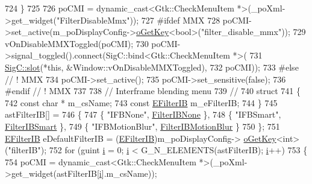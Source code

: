 \begin{DoxyCode}
{{724   \}
725 
726   poCMI = \textcolor{keyword}{dynamic\_cast<}Gtk::CheckMenuItem *\textcolor{keyword}{>}(\_poXml->get\_widget(\textcolor{stringliteral}{"FilterDisableMmx"}));
727 \textcolor{preprocessor}{#ifdef MMX}
728   poCMI->set\_active(m\_poDisplayConfig->\mbox{\hyperlink{class_v_b_a_1_1_config_1_1_section_ab169d7aae4e9dde91418ba1668e3ad39}{oGetKey}}<\textcolor{keywordtype}{bool}>(\textcolor{stringliteral}{"filter\_disable\_mmx"}));
729   vOnDisableMMXToggled(poCMI);
730   poCMI->signal\_toggled().connect(SigC::bind<Gtk::CheckMenuItem *>(
731                                     \mbox{\hyperlink{namespace_sig_c_a92e4f19202b77e78ac1db05f5a62f6b6}{SigC::slot}}(*\textcolor{keyword}{this}, &Window::vOnDisableMMXToggled),
732                                     poCMI));
733 \textcolor{preprocessor}{#else // ! MMX}
734   poCMI->set\_active();
735   poCMI->set\_sensitive(\textcolor{keyword}{false});
736 \textcolor{preprocessor}{#endif // ! MMX}
737 
738   \textcolor{comment}{// Interframe blending menu}
739   \textcolor{comment}{//}
740   \textcolor{keyword}{struct}
741   \{
742     \textcolor{keyword}{const} \textcolor{keywordtype}{char} *    m\_csName;
743     \textcolor{keyword}{const} \mbox{\hyperlink{class_v_b_a_a304ffeb9f4a8b26e7fa4e2eb620d780f}{EFilterIB}} m\_eFilterIB;
744   \}
745   astFilterIB[] =
746   \{
747     \{ \textcolor{stringliteral}{"IFBNone"},       \mbox{\hyperlink{class_v_b_a_a304ffeb9f4a8b26e7fa4e2eb620d780fab054f4d5f2444fb31370e618cfe85eb7}{FilterIBNone}}       \},
748     \{ \textcolor{stringliteral}{"IFBSmart"},      \mbox{\hyperlink{class_v_b_a_a304ffeb9f4a8b26e7fa4e2eb620d780fac1cd2d227ad1026f772ed5cef553199b}{FilterIBSmart}}      \},
749     \{ \textcolor{stringliteral}{"IFBMotionBlur"}, \mbox{\hyperlink{class_v_b_a_a304ffeb9f4a8b26e7fa4e2eb620d780fa2d6d23375f2b61bac1fabffffd25d6ed}{FilterIBMotionBlur}} \}
750   \};
751   \mbox{\hyperlink{class_v_b_a_a304ffeb9f4a8b26e7fa4e2eb620d780f}{EFilterIB}} eDefaultFilterIB = (\mbox{\hyperlink{class_v_b_a_a304ffeb9f4a8b26e7fa4e2eb620d780f}{EFilterIB}})m\_poDisplayConfig->
      \mbox{\hyperlink{class_v_b_a_1_1_config_1_1_section_ab169d7aae4e9dde91418ba1668e3ad39}{oGetKey}}<\textcolor{keywordtype}{int}>(\textcolor{stringliteral}{"filterIB"});
752   \textcolor{keywordflow}{for} (guint \mbox{\hyperlink{expr-lex_8cpp_acb559820d9ca11295b4500f179ef6392}{i}} = 0; \mbox{\hyperlink{expr-lex_8cpp_acb559820d9ca11295b4500f179ef6392}{i}} < G\_N\_ELEMENTS(astFilterIB); \mbox{\hyperlink{expr-lex_8cpp_acb559820d9ca11295b4500f179ef6392}{i}}++)
753   \{
754     poCMI = \textcolor{keyword}{dynamic\_cast<}Gtk::CheckMenuItem *\textcolor{keyword}{>}(\_poXml->get\_widget(astFilterIB[\mbox{\hyperlink{expr-lex_8cpp_acb559820d9ca11295b4500f179ef6392}{i}}].m\_csName));
}}
\end{DoxyCode}

